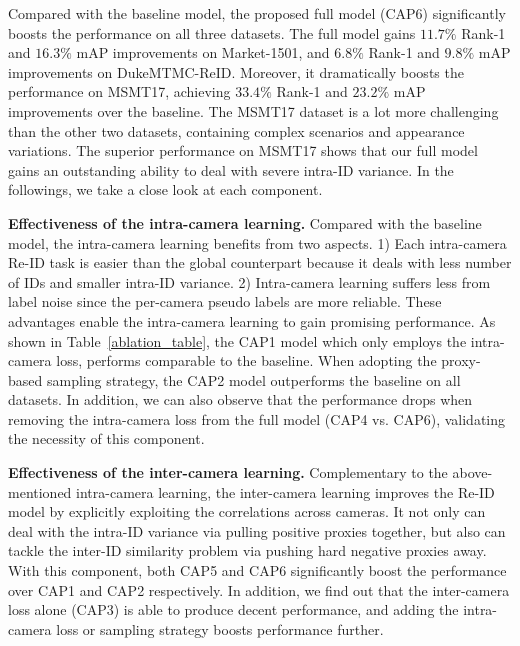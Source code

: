 \documentclass[letterpaper]{article} %
\begin{document}
Compared with the baseline model, the proposed full model (CAP6) significantly boosts the performance on all three datasets. The full model gains $11.7\%$ Rank-1 and $16.3\%$ mAP improvements on Market-1501, and $6.8\%$ Rank-1 and $9.8\%$ mAP improvements on DukeMTMC-ReID. Moreover, it dramatically boosts the performance on MSMT17, achieving $33.4\%$ Rank-1 and $23.2\%$ mAP improvements over the baseline. The MSMT17 dataset is a lot more challenging than the other two datasets, containing complex scenarios and appearance variations. The superior performance on MSMT17 shows that our full model gains an outstanding ability to deal with severe intra-ID variance. In the followings, we take a close look at each component. 



\textbf{Effectiveness of the intra-camera learning.}
Compared with the baseline model, the intra-camera learning benefits from two aspects. 1) Each intra-camera Re-ID task is easier than the global counterpart because it deals with less number of IDs and smaller intra-ID variance. 2) Intra-camera learning suffers less from label noise since the per-camera pseudo labels are more reliable. These advantages enable the intra-camera learning to gain promising performance. As shown in Table~\ref{ablation_table}, the CAP1 model which only employs the intra-camera loss, performs comparable to the baseline. When adopting the proxy-based sampling strategy, the CAP2 model outperforms the baseline on all datasets. In addition, we can also observe that the performance drops when removing the intra-camera loss from the full model (CAP4 vs. CAP6), validating the necessity of this component. 



\textbf{Effectiveness of the inter-camera learning.} Complementary to the above-mentioned intra-camera learning, the inter-camera learning improves the Re-ID model by explicitly exploiting the correlations across cameras. It not only can deal with the intra-ID variance via pulling positive proxies together, but also can tackle the inter-ID similarity problem via pushing hard negative proxies away. 
With this component, both CAP5 and CAP6 significantly boost the performance over CAP1 and CAP2 respectively. In addition, we find out that the inter-camera loss alone (CAP3) is able to produce decent performance, and adding the intra-camera loss or sampling strategy boosts performance further.
\end{document}
